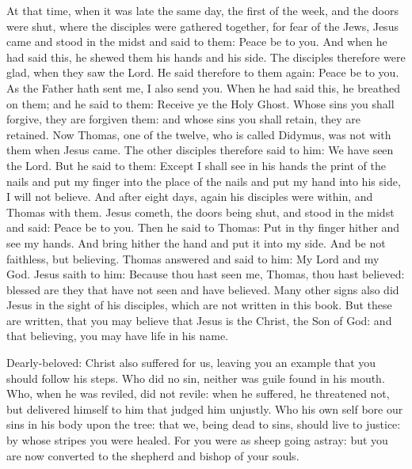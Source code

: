 At that time, when it was late the same day, the first of the week, and the doors were
shut, where the disciples were gathered together, for fear of the Jews, Jesus
came and stood in the midst and said to them: Peace be to you.   And when he had said this, he shewed them
his hands and his side.  The disciples therefore were glad, when they saw the
Lord.  He said therefore to them again: Peace be to you. As the Father hath
sent me, I also send you.  When he had said this, he breathed on them; and he
said to them: Receive ye the Holy Ghost.  Whose sins you shall forgive, they
are forgiven them: and whose sins you shall retain, they are retained.
 Now Thomas, one of the twelve, who is
called Didymus, was not with them when Jesus came.  The other disciples
therefore said to him: We have seen the Lord.  But he said to them: Except I
shall see in his hands the print of the nails and put my finger into the place
of the nails and put my hand into his side, I will not believe.  And after
eight days, again his disciples were within, and Thomas with them. Jesus
cometh, the doors being shut, and stood in the midst and said: Peace be to you.
Then he said to Thomas: Put in thy finger hither and see my hands. And bring
hither the hand and put it into my side.  And be not faithless, but believing.
Thomas answered and said to him: My Lord and my God.  Jesus saith to him:
Because thou hast seen me, Thomas, thou hast believed: blessed are they that
have not seen and have believed.  Many other signs also did Jesus in the sight
of his disciples, which are not written in this book.  But these are written,
that you may believe that Jesus is the Christ, the Son of God: and that
believing, you may have life in his name.





Dearly-beloved: %
Christ also suffered for us, leaving you
an example that you should follow his steps.  Who did no sin, neither was guile
found in his mouth.  Who, when he was reviled, did not revile: when he
suffered, he threatened not, but delivered himself to him that judged him
unjustly.  Who his own self bore our sins in his body upon the tree: that we,
being dead to sins, should live to justice: by whose stripes you were healed.
For you were as sheep going astray: but you are now converted to the shepherd
and bishop of your souls.


